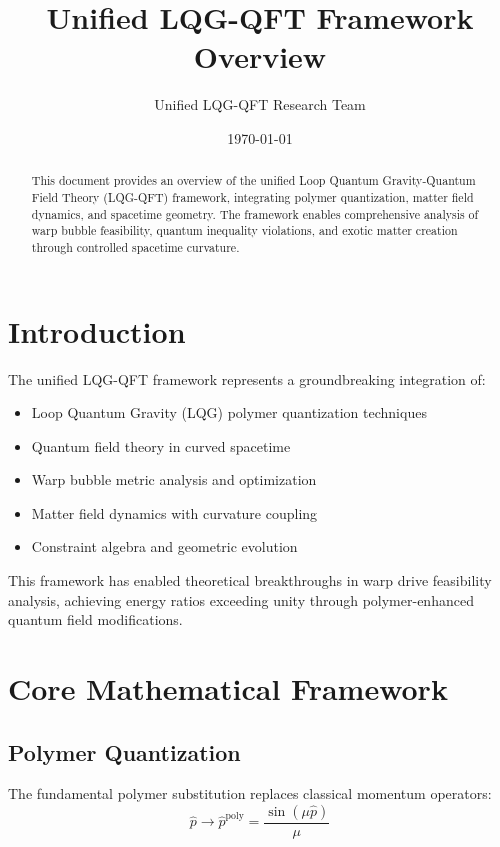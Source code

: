 \documentclass[11pt]{article}
\title{Unified LQG-QFT Framework Overview}
\author{Unified LQG-QFT Research Team}
\date{\today}
\begin{document}
\maketitle

\begin{abstract}
This document provides an overview of the unified Loop Quantum Gravity-Quantum Field Theory (LQG-QFT) framework, integrating polymer quantization, matter field dynamics, and spacetime geometry. The framework enables comprehensive analysis of warp bubble feasibility, quantum inequality violations, and exotic matter creation through controlled spacetime curvature.
\end{abstract}

\section{Introduction}

The unified LQG-QFT framework represents a groundbreaking integration of:
\begin{itemize}
\item Loop Quantum Gravity (LQG) polymer quantization techniques
\item Quantum field theory in curved spacetime
\item Warp bubble metric analysis and optimization
\item Matter field dynamics with curvature coupling
\item Constraint algebra and geometric evolution
\end{itemize}

This framework has enabled theoretical breakthroughs in warp drive feasibility analysis, achieving energy ratios exceeding unity through polymer-enhanced quantum field modifications.

\section{Core Mathematical Framework}

\subsection{Polymer Quantization}

The fundamental polymer substitution replaces classical momentum operators:
\begin{equation}
\hat{p} \rightarrow \hat{p}^{\text{poly}} = \frac{\sin(\mu \hat{p})}{\mu}
\end{equation}
\end{document}
